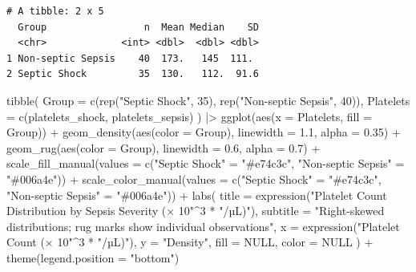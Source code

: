 \documentclass[
  letterpaper,
  DIV=11,
  numbers=noendperiod]{scrartcl}
\newenvironment{Shaded}{\begin{snugshade}}{\end{snugshade}}
\newcommand{\AttributeTok}[1]{\textcolor[rgb]{0.40,0.45,0.13}{#1}}
\newcommand{\ConstantTok}[1]{\textcolor[rgb]{0.56,0.35,0.01}{#1}}
\newcommand{\DecValTok}[1]{\textcolor[rgb]{0.68,0.00,0.00}{#1}}
\newcommand{\FloatTok}[1]{\textcolor[rgb]{0.68,0.00,0.00}{#1}}
\newcommand{\FunctionTok}[1]{\textcolor[rgb]{0.28,0.35,0.67}{#1}}
\newcommand{\NormalTok}[1]{\textcolor[rgb]{0.00,0.23,0.31}{#1}}
\newcommand{\OtherTok}[1]{\textcolor[rgb]{0.00,0.23,0.31}{#1}}
\newcommand{\SpecialCharTok}[1]{\textcolor[rgb]{0.37,0.37,0.37}{#1}}
\newcommand{\StringTok}[1]{\textcolor[rgb]{0.13,0.47,0.30}{#1}}
\begin{document}
\begin{verbatim}
# A tibble: 2 x 5
  Group                 n  Mean Median    SD
  <chr>             <int> <dbl>  <dbl> <dbl>
1 Non-septic Sepsis    40  173.   145  111. 
2 Septic Shock         35  130.   112.  91.6
\end{verbatim}

\begin{Shaded}
\begin{Highlighting}[]
\FunctionTok{tibble}\NormalTok{(}
  \AttributeTok{Group     =} \FunctionTok{c}\NormalTok{(}\FunctionTok{rep}\NormalTok{(}\StringTok{"Septic Shock"}\NormalTok{, }\DecValTok{35}\NormalTok{), }\FunctionTok{rep}\NormalTok{(}\StringTok{"Non{-}septic Sepsis"}\NormalTok{, }\DecValTok{40}\NormalTok{)),}
  \AttributeTok{Platelets =} \FunctionTok{c}\NormalTok{(platelets\_shock, platelets\_sepsis)}
\NormalTok{) }\SpecialCharTok{|\textgreater{}}
  \FunctionTok{ggplot}\NormalTok{(}\FunctionTok{aes}\NormalTok{(}\AttributeTok{x =}\NormalTok{ Platelets, }\AttributeTok{fill =}\NormalTok{ Group)) }\SpecialCharTok{+}
  \FunctionTok{geom\_density}\NormalTok{(}\FunctionTok{aes}\NormalTok{(}\AttributeTok{color =}\NormalTok{ Group), }\AttributeTok{linewidth =} \FloatTok{1.1}\NormalTok{, }\AttributeTok{alpha =} \FloatTok{0.35}\NormalTok{) }\SpecialCharTok{+}
  \FunctionTok{geom\_rug}\NormalTok{(}\FunctionTok{aes}\NormalTok{(}\AttributeTok{color =}\NormalTok{ Group), }\AttributeTok{linewidth =} \FloatTok{0.6}\NormalTok{, }\AttributeTok{alpha =} \FloatTok{0.7}\NormalTok{) }\SpecialCharTok{+}
  \FunctionTok{scale\_fill\_manual}\NormalTok{(}\AttributeTok{values  =} \FunctionTok{c}\NormalTok{(}\StringTok{"Septic Shock"} \OtherTok{=} \StringTok{"\#e74c3c"}\NormalTok{, }\StringTok{"Non{-}septic Sepsis"} \OtherTok{=} \StringTok{"\#006a4e"}\NormalTok{)) }\SpecialCharTok{+}
  \FunctionTok{scale\_color\_manual}\NormalTok{(}\AttributeTok{values =} \FunctionTok{c}\NormalTok{(}\StringTok{"Septic Shock"} \OtherTok{=} \StringTok{"\#e74c3c"}\NormalTok{, }\StringTok{"Non{-}septic Sepsis"} \OtherTok{=} \StringTok{"\#006a4e"}\NormalTok{)) }\SpecialCharTok{+}
  \FunctionTok{labs}\NormalTok{(}
    \AttributeTok{title    =} \FunctionTok{expression}\NormalTok{(}\StringTok{"Platelet Count Distribution by Sepsis Severity  (× 10"}\SpecialCharTok{\^{}}\DecValTok{3} \SpecialCharTok{*} \StringTok{"/µL)"}\NormalTok{),}
    \AttributeTok{subtitle =} \StringTok{"Right{-}skewed distributions; rug marks show individual observations"}\NormalTok{,}
    \AttributeTok{x        =} \FunctionTok{expression}\NormalTok{(}\StringTok{"Platelet Count (× 10"}\SpecialCharTok{\^{}}\DecValTok{3} \SpecialCharTok{*} \StringTok{"/µL)"}\NormalTok{),}
    \AttributeTok{y        =} \StringTok{"Density"}\NormalTok{,}
    \AttributeTok{fill     =} \ConstantTok{NULL}\NormalTok{, }\AttributeTok{color =} \ConstantTok{NULL}
\NormalTok{  ) }\SpecialCharTok{+}
  \FunctionTok{theme}\NormalTok{(}\AttributeTok{legend.position =} \StringTok{"bottom"}\NormalTok{)}
\end{Highlighting}
\end{Shaded}
\end{document}
